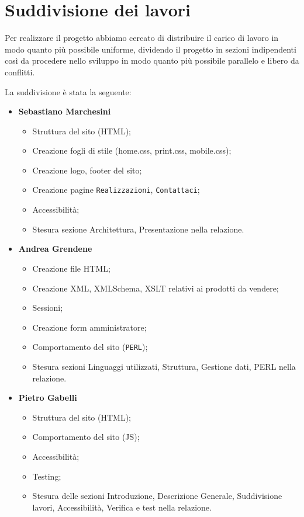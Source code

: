 \section{Suddivisione dei lavori}{
	Per realizzare il progetto abbiamo cercato di distribuire il carico di lavoro in modo quanto più possibile uniforme, dividendo il progetto in sezioni indipendenti così da procedere nello sviluppo in modo quanto più possibile parallelo e libero da conflitti.
	
	La suddivisione è stata la seguente: 	
	\begin{itemize}\itemsep1pt
		\item \textbf{Sebastiano Marchesini} 
		\begin{itemize}\itemsep1pt
			\item Struttura del sito (HTML);
			\item Creazione fogli di stile (home.css, print.css, mobile.css);
			\item Creazione logo, footer del sito;
			\item Creazione pagine \texttt{Realizzazioni}, \texttt{Contattaci};
			\item Accessibilità;
			\item Stesura sezione Architettura, Presentazione nella relazione.
		\end{itemize}
		\item \textbf{Andrea Grendene}
		\begin{itemize}\itemsep1pt
			\item Creazione file HTML;
			\item Creazione XML, XMLSchema, XSLT relativi ai prodotti da vendere;
			\item Sessioni;
			\item Creazione form amministratore;
			\item Comportamento del sito (\texttt{PERL});
			\item Stesura sezioni Linguaggi utilizzati, Struttura, Gestione dati,  PERL nella relazione.
		\end{itemize}
		\item \textbf{Pietro Gabelli}
		\begin{itemize}\itemsep1pt
			\item Struttura del sito (HTML);
			\item Comportamento del sito (JS);
			\item Accessibilità;
			\item Testing;
			\item Stesura delle sezioni Introduzione, Descrizione Generale, Suddivisione lavori,  Accessibilità, Verifica e test nella relazione.
		\end{itemize}
	\end{itemize}
}